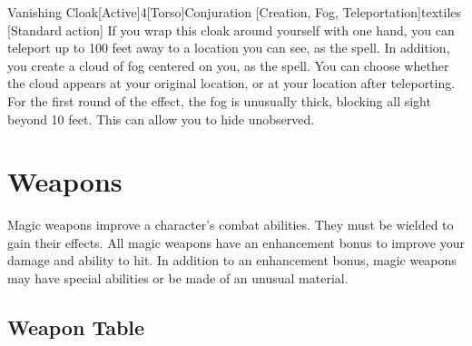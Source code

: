        \begin{magicitemdef}{Vanishing Cloak}[Active]{4}[Torso]{Conjuration [Creation, Fog, Teleportation]}{textiles}
            [Standard action] If you wrap this cloak around yourself with one hand, you can teleport up to 100 feet away to a location you can see, as the  spell.
            In addition, you create a cloud of fog centered on you, as the  spell.
            You can choose whether the cloud appears at your original location, or at your location after teleporting.
            For the first round of the effect, the fog is unusually thick, blocking all sight beyond 10 feet.
            This can allow you to hide unobserved.
        \end{magicitemdef}

\section{Weapons}
    Magic weapons improve a character's combat abilities.
    They must be wielded to gain their effects.
    All magic weapons have an enhancement bonus to improve your damage and ability to hit.
    In addition to an enhancement bonus, magic weapons may have special abilities or be made of an unusual material.

    \subsection{Weapon Table}

